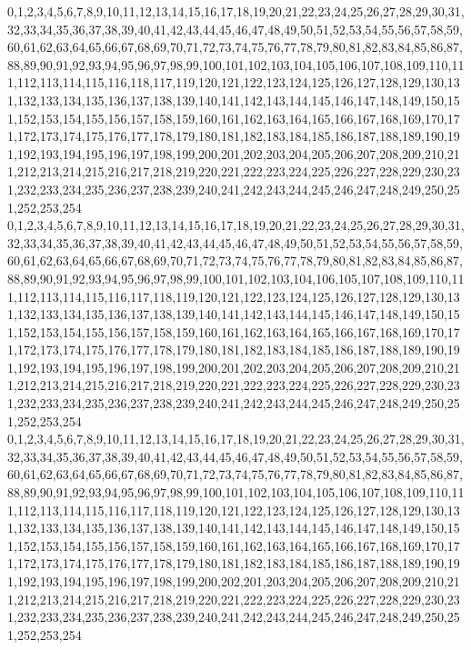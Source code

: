 \documentclass[12pt]{article}
\begin{document}
{0,1,2,3,4,5,6,7,8,9,10,11,12,13,14,15,16,17,18,19,20,21,22,23,24,25,26,27,28,29,30,31,32,33,34,35,36,37,38,39,40,41,42,43,44,45,46,47,48,49,50,51,52,53,54,55,56,57,58,59,60,61,62,63,64,65,66,67,68,69,70,71,72,73,74,75,76,77,78,79,80,81,82,83,84,85,86,87,88,89,90,91,92,93,94,95,96,97,98,99,100,101,102,103,104,105,106,107,108,109,110,111,112,113,114,115,116,118,117,119,120,121,122,123,124,125,126,127,128,129,130,131,132,133,134,135,136,137,138,139,140,141,142,143,144,145,146,147,148,149,150,151,152,153,154,155,156,157,158,159,160,161,162,163,164,165,166,167,168,169,170,171,172,173,174,175,176,177,178,179,180,181,182,183,184,185,186,187,188,189,190,191,192,193,194,195,196,197,198,199,200,201,202,203,204,205,206,207,208,209,210,211,212,213,214,215,216,217,218,219,220,221,222,223,224,225,226,227,228,229,230,231,232,233,234,235,236,237,238,239,240,241,242,243,244,245,246,247,248,249,250,251,252,253,254\\
0,1,2,3,4,5,6,7,8,9,10,11,12,13,14,15,16,17,18,19,20,21,22,23,24,25,26,27,28,29,30,31,32,33,34,35,36,37,38,39,40,41,42,43,44,45,46,47,48,49,50,51,52,53,54,55,56,57,58,59,60,61,62,63,64,65,66,67,68,69,70,71,72,73,74,75,76,77,78,79,80,81,82,83,84,85,86,87,88,89,90,91,92,93,94,95,96,97,98,99,100,101,102,103,104,106,105,107,108,109,110,111,112,113,114,115,116,117,118,119,120,121,122,123,124,125,126,127,128,129,130,131,132,133,134,135,136,137,138,139,140,141,142,143,144,145,146,147,148,149,150,151,152,153,154,155,156,157,158,159,160,161,162,163,164,165,166,167,168,169,170,171,172,173,174,175,176,177,178,179,180,181,182,183,184,185,186,187,188,189,190,191,192,193,194,195,196,197,198,199,200,201,202,203,204,205,206,207,208,209,210,211,212,213,214,215,216,217,218,219,220,221,222,223,224,225,226,227,228,229,230,231,232,233,234,235,236,237,238,239,240,241,242,243,244,245,246,247,248,249,250,251,252,253,254\\
0,1,2,3,4,5,6,7,8,9,10,11,12,13,14,15,16,17,18,19,20,21,22,23,24,25,26,27,28,29,30,31,32,33,34,35,36,37,38,39,40,41,42,43,44,45,46,47,48,49,50,51,52,53,54,55,56,57,58,59,60,61,62,63,64,65,66,67,68,69,70,71,72,73,74,75,76,77,78,79,80,81,82,83,84,85,86,87,88,89,90,91,92,93,94,95,96,97,98,99,100,101,102,103,104,105,106,107,108,109,110,111,112,113,114,115,116,117,118,119,120,121,122,123,124,125,126,127,128,129,130,131,132,133,134,135,136,137,138,139,140,141,142,143,144,145,146,147,148,149,150,151,152,153,154,155,156,157,158,159,160,161,162,163,164,165,166,167,168,169,170,171,172,173,174,175,176,177,178,179,180,181,182,183,184,185,186,187,188,189,190,191,192,193,194,195,196,197,198,199,200,202,201,203,204,205,206,207,208,209,210,211,212,213,214,215,216,217,218,219,220,221,222,223,224,225,226,227,228,229,230,231,232,233,234,235,236,237,238,239,240,241,242,243,244,245,246,247,248,249,250,251,252,253,254\\
}
\end{document}
